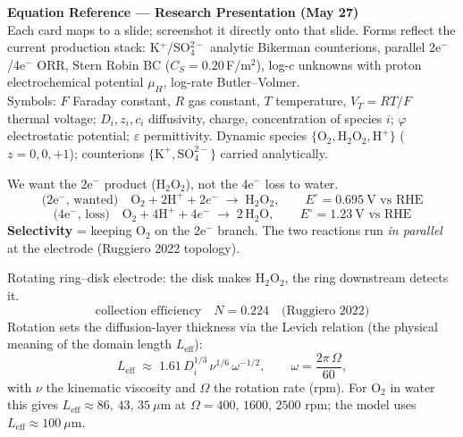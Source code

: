 \documentclass[11pt]{article}
\newcommand{\VT}{V_{T}}
\newcommand{\Eeq}{E^{\circ}}
\newcommand{\CS}{C_{S}}
\begin{document}
\begin{center}
  {\Large\bfseries Equation Reference --- Research Presentation (May 27)}\\[3pt]
  {\small Each card maps to a slide; screenshot it directly onto that slide.
  Forms reflect the current production stack: K$^+$/SO$_4^{2-}$ analytic
  Bikerman counterions, parallel 2e$^-$/4e$^-$ ORR, Stern Robin BC
  ($\CS = 0.20$\,F/m$^2$), log-$c$ unknowns with proton electrochemical
  potential $\mu_H$, log-rate Butler--Volmer.}\\[2pt]
  {\footnotesize Symbols: $F$ Faraday constant, $R$ gas constant, $T$
  temperature, $\VT = RT/F$ thermal voltage; $D_i,z_i,c_i$ diffusivity,
  charge, concentration of species $i$; $\varphi$ electrostatic potential;
  $\varepsilon$ permittivity. Dynamic species $\{\mathrm{O_2},
  \mathrm{H_2O_2}, \mathrm{H^+}\}$ ($z=0,0,+1$); counterions
  $\{\mathrm{K^+}, \mathrm{SO_4^{2-}}\}$ carried analytically.}
\end{center}

\begin{tcolorbox}[cardstyle={Slide 5 --- ORR selectivity: two competing pathways}]
We want the 2e$^-$ product (H$_2$O$_2$), not the 4e$^-$ loss to water.
\[
  \text{(2e$^-$, wanted)}\quad
  \mathrm{O_2} + 2\mathrm{H^+} + 2e^- \;\longrightarrow\; \mathrm{H_2O_2},
  \qquad \Eeq = 0.695~\text{V vs RHE}
\]
\[
  \text{(4e$^-$, loss)}\quad
  \mathrm{O_2} + 4\mathrm{H^+} + 4e^- \;\longrightarrow\; 2\,\mathrm{H_2O},
  \qquad \Eeq = 1.23~\text{V vs RHE}
\]
\textbf{Selectivity} = keeping O$_2$ on the 2e$^-$ branch. The two
reactions run \emph{in parallel} at the electrode (Ruggiero 2022 topology).
\end{tcolorbox}

\begin{tcolorbox}[cardstyle={Slide 6 --- RRDE measurement \& transport}]
Rotating ring--disk electrode: the disk makes H$_2$O$_2$, the ring
downstream detects it.
\[
  \text{collection efficiency}\quad N = 0.224 \quad\text{(Ruggiero 2022)}
\]
Rotation sets the diffusion-layer thickness via the Levich relation
(the physical meaning of the domain length $L_{\mathrm{eff}}$):
\[
  L_{\mathrm{eff}} \;\approx\; 1.61\,D_i^{1/3}\,\nu^{1/6}\,\omega^{-1/2},
  \qquad \omega = \frac{2\pi\,\Omega}{60},
\]
with $\nu$ the kinematic viscosity and $\Omega$ the rotation rate (rpm).
For O$_2$ in water this gives $L_{\mathrm{eff}}\approx 86,\,43,\,35~\mu$m
at $\Omega = 400,\,1600,\,2500$ rpm; the model uses $L_{\mathrm{eff}}
\approx 100~\mu$m.
\end{tcolorbox}
\end{document}
